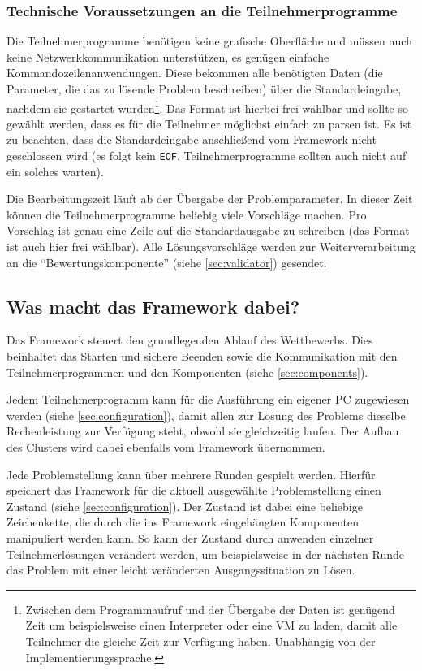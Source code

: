 \documentclass[a4paper, 12pt]{article}
\begin{document}
\subsubsection{Technische Voraussetzungen an die Teilnehmerprogramme}

Die Teilnehmerprogramme benötigen keine grafische Oberfläche und müssen auch
keine Netzwerkkommunikation unterstützen, es genügen einfache
Kommandozeilenanwendungen.
Diese bekommen alle benötigten Daten (die Parameter, die das
zu lösende Problem beschreiben) über die Standardeingabe, nachdem sie gestartet
wurden\footnote{Zwischen dem Programmaufruf und der Übergabe der Daten ist
genügend Zeit um beispielsweise einen Interpreter oder eine VM zu laden, damit
alle Teilnehmer die gleiche Zeit zur Verfügung haben. Unabhängig von der
Implementierungssprache.}.
Das Format ist hierbei frei wählbar und sollte so gewählt werden, dass es für
die Teilnehmer möglichst einfach zu parsen ist.
Es ist zu beachten, dass die Standardeingabe anschließend vom Framework
nicht geschlossen wird (es folgt kein \texttt{EOF}, Teilnehmerprogramme sollten
auch nicht auf ein solches warten).

Die Bearbeitungszeit läuft ab der Übergabe der Problemparameter.
In dieser Zeit können die Teilnehmerprogramme beliebig viele Vorschläge machen.
Pro Vorschlag ist genau eine Zeile auf die Standardausgabe zu schreiben (das
Format ist auch hier frei wählbar).
Alle Lösungsvorschläge werden zur Weiterverarbeitung an die
``Bewertungskomponente'' (siehe \ref{sec:validator}) gesendet.

\subsection{Was macht das Framework dabei?}

Das Framework steuert den grundlegenden Ablauf des Wettbewerbs.
Dies beinhaltet das Starten und sichere Beenden sowie die Kommunikation mit den
Teilnehmerprogrammen und den Komponenten (siehe \ref{sec:components}).

Jedem Teilnehmerprogramm kann für die Ausführung ein eigener PC zugewiesen
werden (siehe \ref{sec:configuration}), damit allen zur Lösung des
Problems dieselbe Rechenleistung zur Verfügung steht, obwohl sie gleichzeitig
laufen.
Der Aufbau des Clusters wird dabei ebenfalls vom Framework übernommen.

Jede Problemstellung kann über mehrere Runden gespielt werden.
Hierfür speichert das Framework für die aktuell ausgewählte Problemstellung
einen Zustand (siehe \ref{sec:configuration}).
Der Zustand ist dabei eine beliebige Zeichenkette, die durch die ins Framework
eingehängten Komponenten manipuliert werden kann.
So kann der Zustand durch anwenden einzelner Teilnehmerlösungen verändert
werden, um beispielsweise in der nächsten Runde das Problem mit einer leicht
veränderten Ausgangssituation zu Lösen.
\end{document}
